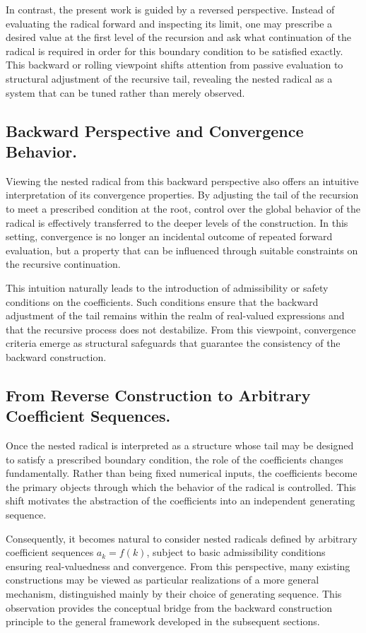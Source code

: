 \documentclass[11pt,a4paper]{amsart}
\theoremstyle{plain}
\theoremstyle{definition}
\theoremstyle{remark}
\begin{document}
In contrast, the present work is guided by a reversed perspective. Instead of evaluating the radical forward and inspecting its limit, one may prescribe a desired value at the first level of the recursion and ask what continuation of the radical is required in order for this boundary condition to be satisfied exactly. This backward or rolling viewpoint shifts attention from passive evaluation to structural adjustment of the recursive tail, revealing the nested radical as a system that can be tuned rather than merely observed.

\subsection*{Backward Perspective and Convergence Behavior.}
Viewing the nested radical from this backward perspective also offers an intuitive interpretation of its convergence properties. By adjusting the tail of the recursion to meet a prescribed condition at the root, control over the global behavior of the radical is effectively transferred to the deeper levels of the construction. In this setting, convergence is no longer an incidental outcome of repeated forward evaluation, but a property that can be influenced through suitable constraints on the recursive continuation.

This intuition naturally leads to the introduction of admissibility or safety conditions on the coefficients. Such conditions ensure that the backward adjustment of the tail remains within the realm of real-valued expressions and that the recursive process does not destabilize. From this viewpoint, convergence criteria emerge as structural safeguards that guarantee the consistency of the backward construction.

\subsection*{From Reverse Construction to Arbitrary Coefficient Sequences.}
Once the nested radical is interpreted as a structure whose tail may be designed to satisfy a prescribed boundary condition, the role of the coefficients changes fundamentally. Rather than being fixed numerical inputs, the coefficients become the primary objects through which the behavior of the radical is controlled. This shift motivates the abstraction of the coefficients into an independent generating sequence.

Consequently, it becomes natural to consider nested radicals defined by arbitrary coefficient sequences \( a_k = f(k) \), subject to basic admissibility conditions ensuring real-valuedness and convergence. From this perspective, many existing constructions may be viewed as particular realizations of a more general mechanism, distinguished mainly by their choice of generating sequence. This observation provides the conceptual bridge from the backward construction principle to the general framework developed in the subsequent sections.
\end{document}
